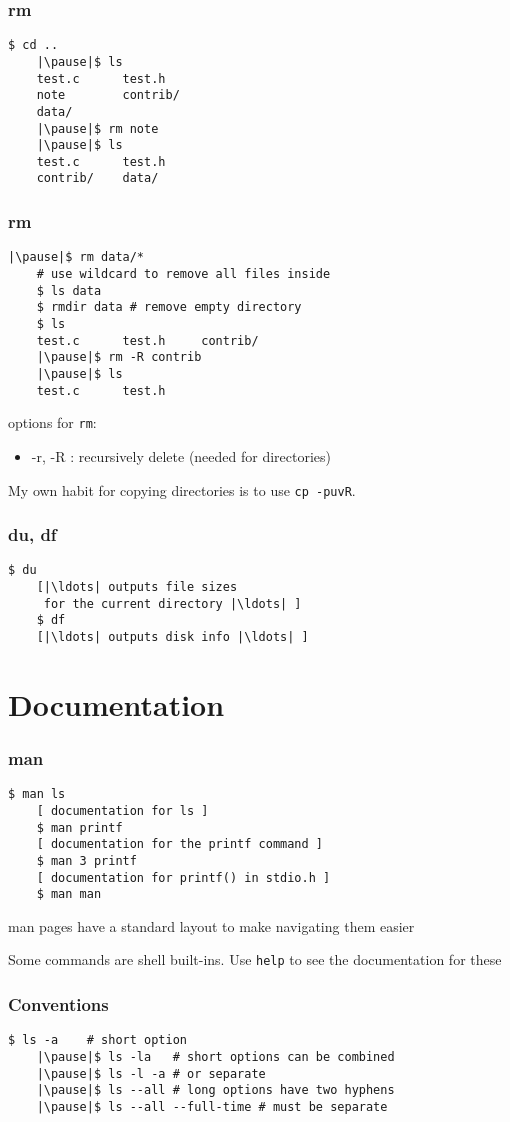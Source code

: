 \documentclass[%
        hyperref={%
                pdfauthor={Zakariyya Mughal},%
                pdfpagemode={None},pdfpagelayout={SinglePage}}%
        xcolor={x11names},%
]{beamer}
\begin{document}
\begin{frame}[fragile]
	\frametitle{rm}
	\begin{lstlisting}[escapeinside=||]
	$ cd ..
	|\pause|$ ls
	test.c      test.h
	note        contrib/
	data/
	|\pause|$ rm note
	|\pause|$ ls
	test.c      test.h
	contrib/    data/
	\end{lstlisting}
\end{frame}
\begin{frame}[fragile]
	\frametitle{rm}
	\begin{lstlisting}[escapeinside=||]
	|\pause|$ rm data/*
	# use wildcard to remove all files inside
	$ ls data
	$ rmdir data # remove empty directory
	$ ls
	test.c      test.h     contrib/
	|\pause|$ rm -R contrib
	|\pause|$ ls
	test.c      test.h
	\end{lstlisting}

	\pause
	options for \texttt{rm}:
	\begin{itemize}
		\item -r, -R : recursively delete (needed for directories)
	\end{itemize}

	My own habit for copying directories is to use \texttt{cp~-puvR}.
\end{frame}
\begin{frame}[fragile]
	\frametitle{du, df}
	\begin{lstlisting}[escapeinside=||]
	$ du
	[|\ldots| outputs file sizes
	 for the current directory |\ldots| ]
	$ df
	[|\ldots| outputs disk info |\ldots| ]
	\end{lstlisting}
\end{frame}

\section{Documentation}\frame{\insertsection}
\begin{frame}[fragile]
	\frametitle{man}
	\begin{lstlisting}[escapeinside=||]
	$ man ls
	[ documentation for ls ]
	$ man printf
	[ documentation for the printf command ]
	$ man 3 printf
	[ documentation for printf() in stdio.h ]
	$ man man
	\end{lstlisting}
	\pause
	man pages have a standard layout to make navigating them
	easier

	\pause Some commands are shell built-ins. Use \texttt{help} to
	see the documentation for these
\end{frame}
\begin{frame}[fragile]
	\frametitle{Conventions}
	\begin{lstlisting}[escapeinside=||]
	$ ls -a    # short option
	|\pause|$ ls -la   # short options can be combined
	|\pause|$ ls -l -a # or separate
	|\pause|$ ls --all # long options have two hyphens
	|\pause|$ ls --all --full-time # must be separate
	\end{lstlisting}
\end{frame}
\end{document}
